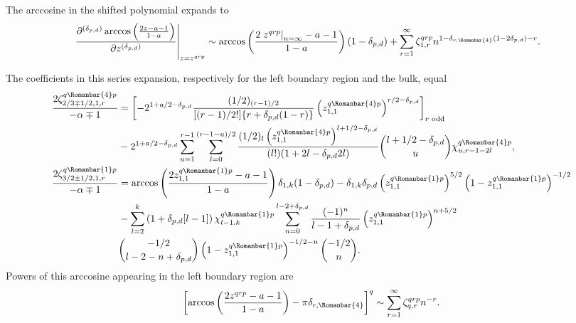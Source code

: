 \documentclass[11pt]{article}
\newcommand{\qg}{q}
\newcommand{\rg}{r}
\newcommand{\rb}{{\scriptsize \Romanbar{1}} }
\newcommand{\rl}{{\scriptsize \Romanbar{4}} }
\newcommand{\pg}{p}
\newcommand{\pd}{d}
\numberwithin{equation}{section}
\begin{document}
The arccosine in the shifted polynomial expands to 
\begin{align}
	& \left.\frac{\partial^{(\delta_{\pg,\pd})} \arccos\left(\frac{2z -a-1}{1-a}\right) }{\partial z^{(\delta_{\pg,\pd})}}\right|_{z=z^{\qg\rg\pg}}  \sim \arccos\left(\frac{2\left.z^{\qg\rg\pg}\right|_{n=\infty} -a-1}{1-a}\right) \left(1-\delta_{\pg,\pd}\right) + \sum_{r=1}^\infty \zeta_{1,r}^{\qg\rg\pg} n^{1-\delta_{\rg,\rl}\left(1-2\delta_{\pg,\pd}\right) -r}.
\end{align}

The coefficients in this series expansion, respectively for the left boundary region and the bulk, equal
\begin{align}
	\frac{2 \zeta_{2/3 \mp 1/2, 1,r}^{\qg\rl\pg}}{-\alpha \mp 1} & = \left[-2^{1+a/2 -\delta_{\pg,\pd}} \frac{ (1/2)_{(r-1)/2} }{[(r-1)/2!]\{r + \delta_{\pg,\pd} (1-r) \}} \left(z_{1,1}^{\qg\rl\pg} \right)^{r/2 -\delta_{\pg,\pd}} \right]_{r \text{ odd}} \\
	&  -  2^{1+a/2 -\delta_{\pg,\pd}}  \sum_{u=1}^{r-1} \sum_{l=0}^{(r-1-u)/2} \frac{ (1/2)_{l} \left(z_{1,1}^{\qg\rl\pg} \right)^{l+1/2- \delta_{\pg,\pd}} }{(l!)(1+2l -\delta_{\pg,\pd} 2l )} {l +1/2 -\delta_{\pg,\pd} \choose u} \chi_{u,r-1-2l}^{\qg\rl\pg}, \\ 
	\frac{2 \zeta_{3/2 \pm 1/2, 1,r}^{\qg\rb\pg}}{-\alpha \mp 1} & = \arccos\left(\frac{2z_{1,1}^{\qg\rb\pg} -a-1}{1-a}\right) \delta_{1,k}(1-\delta_{\pg,\pd}) - \delta_{1,k}\delta_{\pg,\pd} \left(z_{1,1}^{\qg\rb\pg}\right)^{5/2}  \left(1 -z_{1,1}^{\qg\rb\pg} \right)^{-1/2} \\
	& - \sum_{l=2}^{k} \left(1 + \delta_{\pg,\pd}[l-1]\right) \chi_{l-1,k}^{\qg\rb\pg} \sum_{n=0}^{l-2+\delta_{\pg,\pd} } \frac{(-1)^n}{l-1+\delta_{\pg,\pd} } \left(z_{1,1}^{\qg\rb\pg}\right)^{n+5/2} \\ 
	& {-1/2 \choose l-2-n+\delta_{\pg,\pd} } \left(1 -z_{1,1}^{\qg\rb\pg} \right)^{-1/2-n} {-1/2 \choose n}. \label{EquZetaBulk}
\end{align}
Powers of this arccosine appearing in the left boundary region are
\begin{equation} 
	\left[\arccos\left(\frac{2z^{\qg\rg\pg} -a-1}{1-a}\right) -\pi\delta_{\rg,\rl} \right]^q \sim \sum_{r=1}^\infty \zeta_{q,r}^{\qg\rg\pg} n^{-r}.  
\end{equation}
\end{document}
